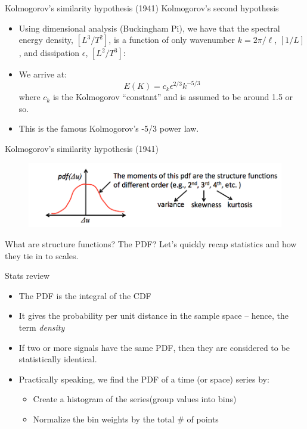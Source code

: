 
\begin{frame}{Kolmogorov's similarity hypothesis (1941)}
	Kolmogorov's second hypothesis
	\begin{itemize}
		\item Using dimensional analysis (Buckingham Pi), we have that the spectral energy density, $[L^3/T^2]$, is a function of only wavenumber $k = 2\pi/\ell$, $[1/L]$, and dissipation $\epsilon$, $[L^2/T^3]$:
		\item We arrive at:
		 $$E(K) = c_k \epsilon^{2/3}k^{-5/3}$$
		 where $c_k$ is the Kolmogorov ``constant'' and is assumed to be around 1.5 or so.
		 \item This is the famous Kolmogorov's -5/3 power law.
	\end{itemize}
\end{frame}

\begin{frame}{Kolmogorov's similarity hypothesis (1941)}
\begin{figure}
	\includegraphics[width=1\textwidth]{pdf.png}
\end{figure}
What are structure functions? The PDF? Let's quickly recap statistics and how they tie in to scales.
\end{frame}


\begin{frame}{Stats review}
\begin{itemize}
	\item The PDF is the integral of the CDF	
	\item It gives the probability per unit distance in the sample space -- hence, the term \textit{density}
	\item If two or more signals have the same PDF, then they are considered to be statistically identical.
	\item Practically speaking, we find the PDF of a time (or space) series by:
	\begin{itemize}
  	\item Create a histogram of the series(group values into bins)
  	\item Normalize the bin weights by the total \# of points
  \end{itemize}
\end{itemize}

\end{frame}

